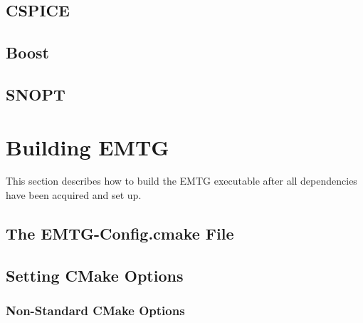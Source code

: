\documentclass[11pt]{article}
\begin{document}


\subsection{CSPICE}
\label{sec:cspice}



\subsection{Boost}
\label{sec:boost}



\subsection{SNOPT}
\label{sec:snopt}



\section{Building EMTG}
\label{sec:building_emtg}

This section describes how to build the \ac{EMTG} executable after all dependencies have been acquired and set up.

\subsection{The EMTG-Config.cmake File}
\label{sec:emtg_config_public_linux}



\subsection{Setting CMake Options}
\label{sec:setting_cmake_options}



\subsubsection{Non-Standard CMake Options}
\label{sec:nonstandard_cmake_options}
\end{document}
